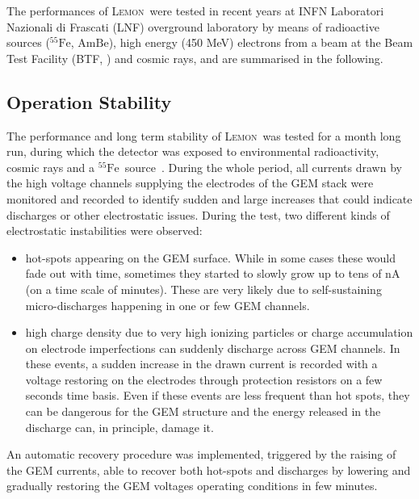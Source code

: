\documentclass[physics,article,submit,moreauthors,pdftex]{Definitions/mdpi}
\newcommand{\fe}{\ensuremath{^{55}\textrm{Fe}}\xspace}
\newcommand{\ambe}{\ensuremath{\textrm{Am} \textrm{Be}}\xspace}
\newcommand{\lemon}{{\textsc{Lemon}}\xspace}
\begin{document}
The performances of \lemon\ were tested in recent years at INFN Laboratori Nazionali di Frascati (LNF) overground laboratory by means of radioactive sources (\fe, \ambe), high energy (450 MeV) electrons from a beam at the Beam Test Facility (BTF, \cite{bib:btf1,bib:btf2}) and cosmic rays, and are summarised in the following.

\subsection{Operation Stability}\label{sec:stability}

The performance and long term stability of \lemon\ was
tested for a month long run, during which the detector was exposed to environmental radioactivity, cosmic rays and a \fe~source~\cite{bib:fe55New}. During the whole period, all currents drawn by the high voltage channels supplying the electrodes of the GEM stack were monitored and recorded to identify sudden and large increases that could indicate discharges or other electrostatic issues.
During the test, two different kinds of electrostatic instabilities were observed:

\begin{itemize}
    \item hot-spots appearing on the GEM surface. While in some cases these would fade out with time, sometimes they started to slowly grow up to tens of nA (on a time scale of minutes). These are very likely due to self-sustaining micro-discharges happening in one or few GEM channels. 
    
    \item high charge density due to very high ionizing particles or charge accumulation on electrode imperfections can suddenly discharge across GEM channels. In these events, a sudden increase in the drawn current is recorded with a voltage restoring on the electrodes through protection resistors on a few seconds time basis.  Even if these events are less frequent than hot spots, they can be dangerous for the GEM structure and the energy released in the discharge can, in principle, damage it. 
\end{itemize}

An automatic recovery procedure was implemented, triggered by the raising of the GEM currents, able to recover both hot-spots and discharges by lowering and gradually restoring the GEM voltages operating conditions in few minutes.
\end{document}
